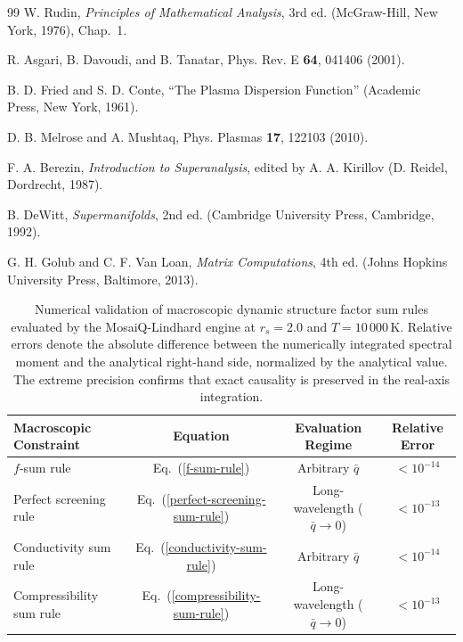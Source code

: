\documentclass[aps,showkeys,noshowpacs,superscriptaddress,pre,preprint]{revtex4-2}
\let\label\orilabel
\begin{document}
\begin{thebibliography}{99}
 W. Rudin, \textit{Principles of Mathematical Analysis}, 3rd ed.
(McGraw-Hill, New York, 1976), Chap.~1.

 R. Asgari, B. Davoudi, and B. Tanatar, Phys. Rev. E \textbf{64}, 041406 (2001).

 B. D. Fried and S. D. Conte,  ``The Plasma Dispersion Function'' (Academic Press, New York, 1961).

 D. B. Melrose and A. Mushtaq, Phys. Plasmas \textbf{17}, 122103 (2010).

 F. A. Berezin, \textit{Introduction to Superanalysis}, edited by A. A. Kirillov
(D. Reidel, Dordrecht, 1987).

 B. DeWitt, \textit{Supermanifolds}, 2nd ed. (Cambridge University Press, Cambridge, 1992).

 G. H. Golub and C. F. Van Loan, \textit{Matrix Computations}, 4th ed.
(Johns Hopkins University Press, Baltimore, 2013).
\end{thebibliography}

\clearpage
\begin{table}[p]
\caption{Numerical validation of macroscopic dynamic structure factor sum rules evaluated by the MosaiQ-Lindhard engine at $r_s = 2.0$ and $T = 10\,000\,\mathrm{K}$. Relative errors denote the absolute difference between the numerically integrated spectral moment and the analytical right-hand side, normalized by the analytical value. The extreme precision confirms that exact causality is preserved in the real-axis integration.}
\label{tab:sum-rules}
\begin{ruledtabular}
\begin{tabular}{lccc}
\textbf{Macroscopic Constraint} & \textbf{Equation} & \textbf{Evaluation Regime} & \textbf{Relative Error} \\
\hline
$f$-sum rule & Eq.~(\ref{f-sum-rule}) & Arbitrary $\bar{q}$ & $< 10^{-14}$ \\
Perfect screening rule & Eq.~(\ref{perfect-screening-sum-rule}) & Long-wavelength ($\bar{q} \to 0$) & $< 10^{-13}$ \\
Conductivity sum rule & Eq.~(\ref{conductivity-sum-rule}) & Arbitrary $\bar{q}$ & $< 10^{-14}$ \\
Compressibility sum rule & Eq.~(\ref{compressibility-sum-rule}) & Long-wavelength ($\bar{q} \to 0$) & $< 10^{-13}$ \\
\end{tabular}
\end{ruledtabular}
\end{table}
\end{document}
